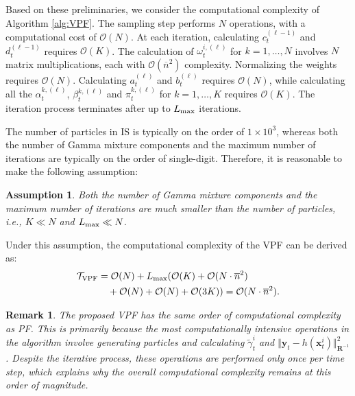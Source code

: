 \documentclass[10pt,twocolumn,twoside]{IEEEtran}
\newtheorem{assumption}{Assumption}
\newtheorem{remark}{Remark}
\newcommand{\fs}{\text{.}} %
\newcommand{\x}{{ \bm{x} }}
\newcommand{\y}{{ \bm{y} }}
\begin{document}
Based on these preliminaries, we consider the computational complexity of Algorithm \ref{alg:VPF}. The sampling step performs $N$ operations, with a computational cost of $\mathcal{O}(N)$. At each iteration, calculating $c_t^{(\ell-1)}$ and $d_t^{(\ell-1)}$ requires $\mathcal{O}(K)$. The calculation of $\omega_t^{i,(\ell)}$ for $k=1,\dots,N$ involves $N$ matrix multiplications, each with $\mathcal{O}(\overline{n}^2)$ complexity. Normalizing the weights requires $\mathcal{O}(N)$. Calculating $a_t^{(\ell)}$ and $b_t^{(\ell)}$ requires $\mathcal{O}(N)$, while calculating all the $\alpha_t^{k,(\ell)}$, $\beta_t^{k,(\ell)}$ and $\pi_t^{k,(\ell)}$ for $k=1,\dots,K$ requires $\mathcal{O}(K)$. The iteration process terminates after up to $L_{\rm max}$ iterations.

The number of particles in IS is typically on the order of $1\times10^3$\cite{schon2005marginalized}, whereas both the number of Gamma mixture components and the maximum number of iterations are typically on the order of single-digit\cite{zhu2021adaptive}. Therefore, it is reasonable to make the following assumption:
\begin{assumption}
    Both the number of Gamma mixture components and the maximum number of iterations are much smaller than the number of particles, i.e., $K\ll N$ and $L_{\rm max}\ll N$.
\end{assumption}
Under this assumption, the computational complexity of the VPF can be derived as:
\begin{equation*}
\begin{split}
    \mathcal{T}_{\rm VPF} &= \mathcal{O}(N)+L_{\rm max}(\mathcal{O}(K)+\mathcal{O}(N\cdot\overline{n}^2)\\
    &\quad+ \mathcal{O}(N)+\mathcal{O}(N)+\mathcal{O}(3K))=\mathcal{O}(N\cdot\overline{n}^2) \fs
\end{split}
\end{equation*}

\begin{remark}
    The proposed VPF has the same order of computational complexity as PF. This is primarily because the most computationally intensive operations in the algorithm involve generating particles and calculating $\tilde\gamma_t^i$ and $\Vert\y_t - h(\x_t^i)\Vert^2_{\bm{R}^{-1}}$. Despite the iterative process, these operations are performed only once per time step, which explains why the overall computational complexity remains at this order of magnitude.  
\end{remark}
\end{document}
